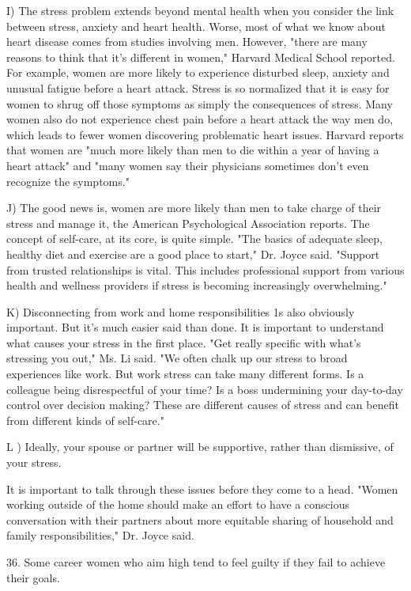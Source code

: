 \documentclass[UTF8,11pt]{ctexart}
\begin{document}
I) The stress problem extends beyond mental health when you consider the link between stress, anxiety and heart health. Worse, most of what we know about heart disease comes from studies involving men. However, "there are many reasons to think that it's different in women," Harvard Medical School reported. For example, women are more likely to experience disturbed sleep, anxiety and unusual fatigue before a heart attack. Stress is so normalized that it is easy for women to shrug off those symptoms as simply the consequences of stress. Many women also do not experience chest pain before a heart attack the way men do, which leads to fewer women discovering problematic heart issues. Harvard reports that women are "much more likely than men to die within a year of having a heart attack" and "many women say their physicians sometimes don't even recognize the symptoms."


J) The good news is, women are more likely than men to take charge of their stress and manage it, the American Psychological Association reports. The concept of self-care, at its core, is quite simple. "The basics of adequate sleep, healthy diet and exercise are a good place to start," Dr. Joyce said. "Support from trusted relationships is vital. This includes professional support from various health and wellness providers if stress is becoming increasingly overwhelming."


K) Disconnecting from work and home responsibilities 1s also obviously important. But it's much easier said than done. It is important to understand what causes your stress in the first place. "Get really specific with what's stressing you out," Ms. Li said. "We often chalk up our stress to broad experiences like work. But work stress can take many different forms. Is a colleague being disrespectful of your time? Is a boss undermining your day-to-day control over decision making? These are different causes of stress and can benefit from different kinds of self-care."


L ) Ideally, your spouse or partner will be supportive, rather than dismissive, of your stress.


It is important to talk through these issues before they come to a head. "Women working outside of the home should make an effort to have a conscious conversation with their partners about more equitable sharing of household and family responsibilities," Dr. Joyce said.


36. Some career women who aim high tend to feel guilty if they fail to achieve their goals.
\end{document}
